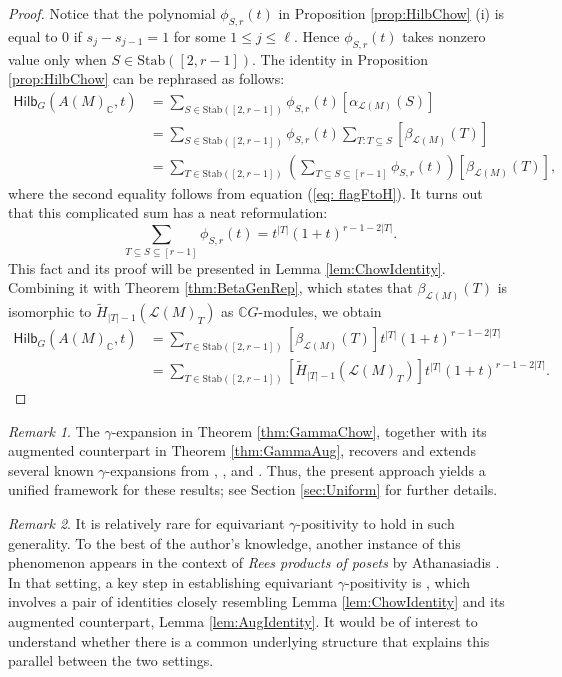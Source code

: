 \documentclass[reqno]{amsart}
\newcommand{\Stab}{{\mathrm{Stab}}}
\renewcommand{\L}{{\mathcal{L}}}
\newcommand{\Hilb}{{\mathsf{Hilb}}}
\theoremstyle{definition}
\theoremstyle{remark}
\newtheorem{rem}{Remark}[section]
\begin{document}
\begin{proof}
Notice that the polynomial $\phi_{S,r}(t)$ in Proposition \ref{prop:HilbChow} (i) is equal to $0$ if $s_j-s_{j-1}=1$ for some $1\le j\le \ell$.
Hence $\phi_{S,r}(t)$ takes nonzero value only when $S\in\Stab([2,r-1])$. 
The identity in Proposition \ref{prop:HilbChow} can be rephrased as follows:
\begin{align*}
    \Hilb_G(A(M)_{\mathbb{C}},t)
    &=\sum_{S\in \Stab([2,r-1])}\phi_{S,r}(t)[\alpha_{\L(M)}(S)]\\
    &=\sum_{S\in \Stab([2,r-1])}\phi_{S,r}(t)\sum_{T:T\subseteq S}[\beta_{\L(M)}(T)]\\
    &=\sum_{T\in\Stab([2,r-1])}\left(\sum_{T\subseteq S\subseteq [r-1]}\phi_{S,r}(t)\right)[\beta_{\L(M)}(T)],
\end{align*}
where the second equality follows from equation (\ref{eq: flagFtoH}). 
It turns out that this complicated sum has a neat reformulation:
\[
    \sum_{T\subseteq S\subseteq [r-1]}\phi_{S,r}(t)=t^{|T|}(1+t)^{r-1-2|T|}.
\]
This fact and its proof will be presented in Lemma \ref{lem:ChowIdentity}. Combining it with Theorem \ref{thm:BetaGenRep}, which states that $\beta_{\L(M)}(T)$ is isomorphic to $\tilde{H}_{|T|-1}(\L(M)_T)$ as $\mathbb{C}G$-modules, we obtain
\begin{align*}
    \Hilb_G(A(M)_{\mathbb{C}},t)
    &=\sum_{T\in\Stab([2,r-1])}[\beta_{\L(M)}(T)]t^{|T|}(1+t)^{r-1-2|T|}\\
    &=\sum_{T\in\Stab([2,r-1])}[\tilde{H}_{|T|-1}(\L(M)_T)]t^{|T|}(1+t)^{r-1-2|T|}.
\end{align*}
\end{proof}

\begin{rem}
The $\gamma$-expansion in Theorem \ref{thm:GammaChow}, together with its augmented counterpart in Theorem \ref{thm:GammaAug}, recovers and extends several known $\gamma$-expansions from \cite{ShareshianWachs2010}, \cite{ShareshianWachs2020}, and \cite{AthanasiadisGamma}.
Thus, the present approach yields a unified framework for these results; see Section \ref{sec:Uniform} for further details.
\end{rem}

\begin{rem}
It is relatively rare for equivariant $\gamma$-positivity to hold in such generality. To the best of the author's knowledge, another instance of this phenomenon appears in the context of \emph{Rees products of posets} by Athanasiadis  \cite{Athanasiadis2020EqGamma}.
In that setting, a key step in establishing equivariant $\gamma$-positivity is \cite[Lemma 3.1]{Athanasiadis2020EqGamma}, which involves a pair of identities closely resembling Lemma \ref{lem:ChowIdentity} and its augmented counterpart, Lemma \ref{lem:AugIdentity}.
It would be of interest to understand whether there is a common underlying structure that explains this parallel between the two settings.
\end{rem}
\end{document}
